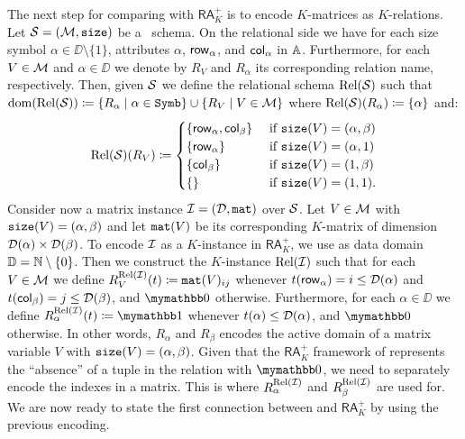 The next step for comparing \langsum with $\mathsf{RA}_{K}^+$  is to encode $K$-matrices as $K$-relations.
Let $\mathcal{S}=(\mathcal{M},\texttt{size})$ be a \lang\ schema. On the relational side
we have for each size symbol $\alpha\in\DD\setminus\{1\}$, attributes $\alpha$, $\mathsf{row}_\alpha$, and $\mathsf{col}_\alpha$ in $\mathbb{A}$. Furthermore, for each $V\in\mathcal{M}$ and $\alpha \in \DD$ we denote
by $R_V$ and $R_\alpha$ its corresponding relation name, respectively. Then, given $\mathcal{S}$ we define the relational schema $\text{Rel}(\mathcal{S})$ such that $\operatorname{dom}(\text{Rel}(\mathcal{S}))\coloneqq   \{R_\alpha \mid \alpha\in\texttt{Symb}\} \cup \{R_V \mid V \in \mathcal{M}\}$ where $\text{Rel}(\mathcal{S})(R_\alpha)\coloneqq  \{\alpha\}$ and:
\[
\text{Rel}(\mathcal{S})(R_V)\coloneqq  \begin{cases}
\lbrace\mathsf{row}_\alpha,\mathsf{col}_\beta \rbrace & \text{ if $ \texttt{size}(V)=(\alpha,\beta)$} \\
\lbrace\mathsf{row}_\alpha \rbrace & \text{ if $ \texttt{size}(V)=(\alpha,1)$} \\
\lbrace\mathsf{col}_\beta \rbrace  &
\text{ if $ \texttt{size}(V)=(1,\beta)$} \\
\lbrace\rbrace & \text{ if $\texttt{size}(V)=(1,1)$}.
\end{cases}
\]
Consider now a matrix instance $\mathcal{I} = (\mathcal{D},\texttt{mat})$ over $\mathcal{S}$.
Let $V\in\mathcal{M}$ with $\texttt{size}(V)=(\alpha,\beta)$ and let $\texttt{mat}(V)$ be its corresponding $K$-matrix of dimension $\mathcal{D}(\alpha)\times \mathcal{D}(\beta)$.
To encode $\mathcal{I}$ as a $K$-instance in $\mathsf{RA}_{K}^+$, we use as data domain $\mathbb{D} = \mathbb{N} \setminus \{0\}$. Then we construct the $K$-instance $\text{Rel}(\mathcal{I})$ such that for each $V\in\mathcal{M}$ we define 
$R_V^{\text{Rel}(\mathcal{I})}(t)\coloneqq \texttt{mat}(V)_{ij}$ whenever $t(\mathsf{row}_\alpha) = i \leq \mathcal{D}(\alpha)$ and $t(\mathsf{col}_\beta) = j \leq \mathcal{D}(\beta)$, and $\kzero$ otherwise. Furthermore, for each $\alpha \in \DD$ we define $R_\alpha^{\text{Rel}(\I)}(t)\coloneqq \kone$ whenever $t(\alpha) \leq \mathcal{D}(\alpha)$, and $\kzero$ otherwise. In other words, $R_\alpha$ and $R_\beta$ encodes the active domain of a matrix variable $V$ with $\texttt{size}(V)=(\alpha,\beta)$. Given that the $\mathsf{RA}_{K}^+$ framework of \cite{GreenKT07} represents the ``absence'' of a tuple in the relation with $\kzero$, we need to separately encode the indexes in a matrix.
This is where $R_\alpha^{\text{Rel}(\mathcal{I})}$ and $R_\beta^{\text{Rel}(\mathcal{I})}$ are used for.
We are now ready to state the first connection between \langsum and $\mathsf{RA}_{K}^+$  by using the previous encoding.
